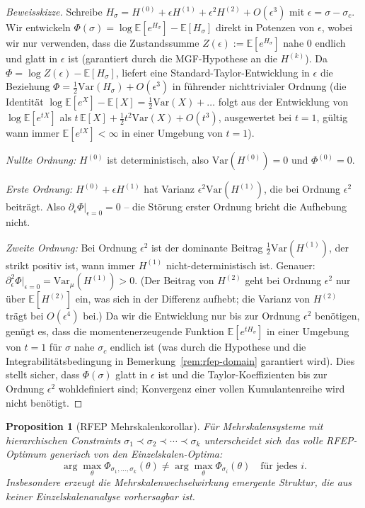 \documentclass[12pt,a4paper]{article}
\newtheorem{proposition}[theorem]{Proposition}
\theoremstyle{definition}
\theoremstyle{remark}
\newcommand{\EE}{\mathbb{E}}
\begin{document}
\begin{proof}[Beweisskizze]
Schreibe $H_\sigma = H^{(0)} + \epsilon H^{(1)} + \epsilon^2 H^{(2)} + O(\epsilon^3)$ mit $\epsilon = \sigma - \sigma_c$. Wir entwickeln $\Phi(\sigma) = \log \EE[e^{H_\sigma}] - \EE[H_\sigma]$ direkt in Potenzen von $\epsilon$, wobei wir nur verwenden, dass die Zustandssumme $Z(\epsilon) := \EE[e^{H_\sigma}]$ nahe $0$ endlich und glatt in $\epsilon$ ist (garantiert durch die MGF-Hypothese an die $H^{(k)}$). Da $\Phi = \log Z(\epsilon) - \EE[H_\sigma]$, liefert eine Standard-Taylor-Entwicklung in $\epsilon$ die Beziehung $\Phi = \tfrac{1}{2}\mathrm{Var}(H_\sigma) + O(\epsilon^3)$ in führender nichttrivialer Ordnung (die Identität $\log \EE[e^X] - \EE[X] = \tfrac{1}{2}\mathrm{Var}(X) + \ldots$ folgt aus der Entwicklung von $\log \EE[e^{tX}]$ als $t\,\EE[X] + \tfrac{1}{2}t^2\mathrm{Var}(X) + O(t^3)$, ausgewertet bei $t=1$, gültig wann immer $\EE[e^{tX}] < \infty$ in einer Umgebung von $t=1$).

\smallskip\noindent
\emph{Nullte Ordnung:} $H^{(0)}$ ist deterministisch, also $\mathrm{Var}(H^{(0)}) = 0$ und $\Phi^{(0)} = 0$.

\smallskip\noindent
\emph{Erste Ordnung:} $H^{(0)} + \epsilon H^{(1)}$ hat Varianz $\epsilon^2 \mathrm{Var}(H^{(1)})$, die bei Ordnung $\epsilon^2$ beiträgt. Also $\partial_\epsilon \Phi|_{\epsilon = 0} = 0$ -- die Störung erster Ordnung bricht die Aufhebung nicht.

\smallskip\noindent
\emph{Zweite Ordnung:} Bei Ordnung $\epsilon^2$ ist der dominante Beitrag $\tfrac{1}{2}\mathrm{Var}(H^{(1)})$, der strikt positiv ist, wann immer $H^{(1)}$ nicht-deterministisch ist. Genauer: $\partial^2_\epsilon \Phi|_{\epsilon=0} = \mathrm{Var}_\mu(H^{(1)}) > 0$. (Der Beitrag von $H^{(2)}$ geht bei Ordnung $\epsilon^2$ nur über $\EE[H^{(2)}]$ ein, was sich in der Differenz aufhebt; die Varianz von $H^{(2)}$ trägt bei $O(\epsilon^4)$ bei.) Da wir die Entwicklung nur bis zur Ordnung $\epsilon^2$ benötigen, genügt es, dass die momentenerzeugende Funktion $\EE[e^{tH_\sigma}]$ in einer Umgebung von $t=1$ für $\sigma$ nahe $\sigma_c$ endlich ist (was durch die Hypothese und die Integrabilitätsbedingung in Bemerkung~\ref{rem:rfep-domain} garantiert wird). Dies stellt sicher, dass $\Phi(\sigma)$ glatt in $\epsilon$ ist und die Taylor-Koeffizienten bis zur Ordnung $\epsilon^2$ wohldefiniert sind; Konvergenz einer vollen Kumulantenreihe wird nicht benötigt.
\end{proof}

\begin{proposition}[RFEP Mehrskalenkorollar]
\label{prop:rfep-multi}
Für Mehrskalensysteme mit hierarchischen Constraints $\sigma_1 \prec \sigma_2 \prec \cdots \prec \sigma_k$ unterscheidet sich das volle RFEP-Optimum generisch von den Einzelskalen-Optima:
\[
\arg\max_\theta \Phi_{\sigma_1, \ldots, \sigma_k}(\theta) \neq \arg\max_\theta \Phi_{\sigma_i}(\theta) \quad \text{für jedes } i.
\]
Insbesondere erzeugt die Mehrskalenwechselwirkung emergente Struktur, die aus keiner Einzelskalenanalyse vorhersagbar ist.
\end{proposition}
\end{document}
